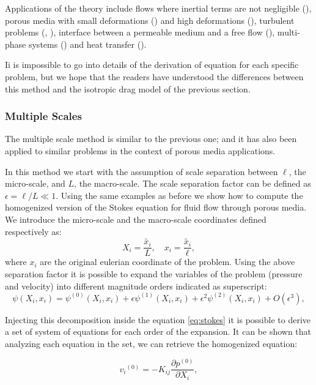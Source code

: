 Applications of the theory include flows where inertial terms are not negligible (\citet{whitaker1996forchheimer}), porous media with small deformations (\citet{whitaker1986flow2}) and high deformations (\citet{hussong2011continuum}), turbulent problems (\citet{soulaine2014}, \citet{breugem2006influence}), interface between a permeable medium and a free flow (\citet{beavers1967boundary}), multi-phase systems (\citet{whitaker1973transport}) and heat transfer (\citet{carbonell1984heat}).

Ii is impossible to go into details of the derivation of equation for each specific problem, but we hope that the readers have understood the differences between this method and the isotropic drag model of the previous section.

\subsubsection{Multiple Scales}

The multiple scale method is similar to the previous one; and it has also been applied to similar problems in the context of porous media applications.

In this method we start with the assumption of scale separation between $\ell$, the micro-scale, and $L$, the macro-scale.
The scale separation factor can be defined as $\epsilon = \ell/L \ll 1$.
Using the same examples as before we show how to compute the homogenized version of the Stokes equation for fluid flow through porous media.
We introduce the micro-scale and the macro-scale coordinates defined respectively as:
$$
 X_i = \dfrac{\tilde{x_i}}{L}, \quad   x_i = \dfrac{\tilde{x_i}}{\ell},
$$
where $x_i$ are the original eulerian coordinate of the problem.
Using the above separation factor it is possible to expand the variables of the problem (pressure and velocity) into different magnitude orders indicated as superscript:
$$
\psi(X_i, x_i) = \psi^{(0)}(X_i, x_i)  +\epsilon \psi^{(1)}(X_i, x_i) +\epsilon^2 \psi^{(2)}(X_i, x_i) +O(\epsilon^3),
$$

Injecting this decomposition inside the equation \eqref{eq:stokes} it is possible to derive a set of system of equations for each order of the expansion.
It can be shown that analyzing each equation in the set, we can retrieve the homogenized equation:

\begin{equation}
{v_i}^{(0)} = -K_{ij} \dfrac{\partial p^{(0)}}{\partial X_i},
\label{eq:darcy_ms}
\end{equation} 

